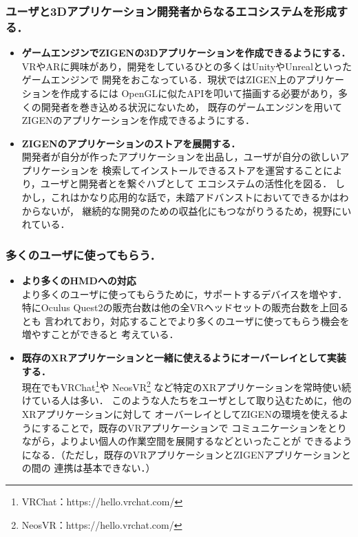 \subsubsection*{ユーザと3Dアプリケーション開発者からなるエコシステムを形成する．}

\begin{itemize}
  \item \textbf{ゲームエンジンでZIGENの3Dアプリケーションを作成できるようにする．}\\
        VRやARに興味があり，開発をしているひとの多くはUnityやUnrealといったゲームエンジンで
        開発をおこなっている．現状ではZIGEN上のアプリケーションを作成するには
        OpenGLに似たAPIを叩いて描画する必要があり，多くの開発者を巻き込める状況にないため，
        既存のゲームエンジンを用いてZIGENのアプリケーションを作成できるようにする．

  \item \textbf{ZIGENのアプリケーションのストアを展開する．}\\
        開発者が自分が作ったアプリケーションを出品し，ユーザが自分の欲しいアプリケーションを
        検索してインストールできるストアを運営することにより，ユーザと開発者とを繋ぐハブとして
        エコシステムの活性化を図る．
        しかし，これはかなり応用的な話で，未踏アドバンストにおいてできるかはわからないが，
        継続的な開発のための収益化にもつながりうるため，視野にいれている．
\end{itemize}

\subsubsection*{多くのユーザに使ってもらう．}

\begin{itemize}
  \item \textbf{より多くのHMDへの対応}\\
        より多くのユーザに使ってもらうために，サポートするデバイスを増やす．
        特にOculus Quest2の販売台数は他の全VRヘッドセットの販売台数を上回るとも
        言われており，対応することでより多くのユーザに使ってもらう機会を増やすことができると
        考えている．

  \item \textbf{既存のXRアプリケーションと一緒に使えるようにオーバーレイとして実装する．}\\
        現在でもVRChat\footnote{VRChat：https://hello.vrchat.com/}や
        NeosVR\footnote{NeosVR：https://hello.vrchat.com/}
        など特定のXRアプリケーションを常時使い続けている人は多い．
        このような人たちをユーザとして取り込むために，他のXRアプリケーションに対して
        オーバーレイとしてZIGENの環境を使えるようにすることで，既存のVRアプリケーションで
        コミュニケーションをとりながら，よりよい個人の作業空間を展開するなどといったことが
        できるようになる．（ただし，既存のVRアプリケーションとZIGENアプリケーションとの間の
        連携は基本できない．）
\end{itemize}

